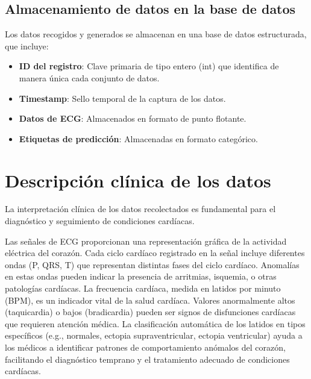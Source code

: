 \subsection{Almacenamiento de datos en la base de datos}
Los datos recogidos y generados se almacenan en una base de datos estructurada, que incluye:

\begin{itemize}
    \item \textbf{ID del registro}: Clave primaria de tipo entero (int) que identifica de manera única cada conjunto de datos.
    \item \textbf{Timestamp}: Sello temporal de la captura de los datos.
    \item \textbf{Datos de ECG}: Almacenados en formato de punto flotante.
    \item \textbf{Etiquetas de predicción}: Almacenadas en formato categórico.
\end{itemize}




\section{Descripción clínica de los datos}

La interpretación clínica de los datos recolectados es fundamental para el diagnóstico y seguimiento de condiciones cardíacas.

Las señales de ECG proporcionan una representación gráfica de la actividad eléctrica del corazón. Cada ciclo cardíaco registrado en la señal incluye diferentes ondas (P, QRS, T) que representan distintas fases del ciclo cardíaco. Anomalías en estas ondas pueden indicar la presencia de arritmias, isquemia, o otras patologías cardíacas.
La frecuencia cardíaca, medida en latidos por minuto (BPM), es un indicador vital de la salud cardíaca. Valores anormalmente altos (taquicardia) o bajos (bradicardia) pueden ser signos de disfunciones cardíacas que requieren atención médica.
La clasificación automática de los latidos en tipos específicos (e.g., normales, ectopia supraventricular, ectopia ventricular) ayuda a los médicos a identificar patrones de comportamiento anómalos del corazón, facilitando el diagnóstico temprano y el tratamiento adecuado de condiciones cardíacas.

